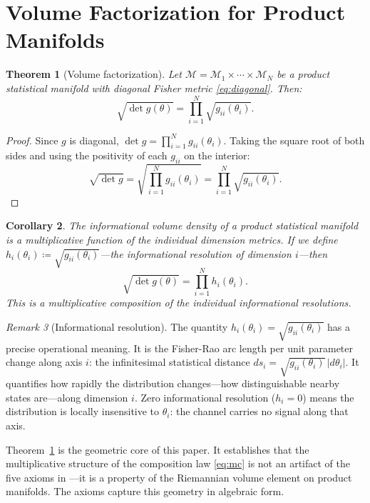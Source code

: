 \documentclass[12pt, a4paper]{article}
\newtheorem{theorem}{Theorem}[section]
\newtheorem{corollary}[theorem]{Corollary}
\theoremstyle{definition}
\theoremstyle{remark}
\newtheorem{remark}[theorem]{Remark}
\begin{document}
\section{Volume Factorization for Product Manifolds}\label{sec:factorization}

\begin{theorem}[Volume factorization]\label{thm:factor}
Let $\mathcal{M} = \mathcal{M}_1 \times \cdots \times \mathcal{M}_N$ be a product statistical manifold with diagonal Fisher metric \eqref{eq:diagonal}. Then:
\begin{equation}\label{eq:volfactor}
\sqrt{\det g(\theta)} = \prod_{i=1}^{N} \sqrt{g_{ii}(\theta_i)}.
\end{equation}
\end{theorem}

\begin{proof}
Since $g$ is diagonal, $\det g = \prod_{i=1}^{N} g_{ii}(\theta_i)$. Taking the square root of both sides and using the positivity of each $g_{ii}$ on the interior:
\[
\sqrt{\det g} = \sqrt{\prod_{i=1}^{N} g_{ii}(\theta_i)} = \prod_{i=1}^{N} \sqrt{g_{ii}(\theta_i)}.
\]
\end{proof}

\begin{corollary}\label{cor:mult}
The informational volume density of a product statistical manifold is a multiplicative function of the individual dimension metrics. If we define $h_i(\theta_i) \coloneqq \sqrt{g_{ii}(\theta_i)}$---the \textit{informational resolution} of dimension $i$---then
\[
\sqrt{\det g(\theta)} = \prod_{i=1}^{N} h_i(\theta_i).
\]
This is a multiplicative composition of the individual informational resolutions.
\end{corollary}

\begin{remark}[Informational resolution]
The quantity $h_i(\theta_i) = \sqrt{g_{ii}(\theta_i)}$ has a precise operational meaning. It is the Fisher-Rao arc length per unit parameter change along axis $i$: the infinitesimal statistical distance $ds_i = \sqrt{g_{ii}(\theta_i)} \, |d\theta_i|$. It quantifies how rapidly the distribution changes---how distinguishable nearby states are---along dimension $i$. Zero informational resolution ($h_i = 0$) means the distribution is locally insensitive to $\theta_i$: the channel carries no signal along that axis.
\end{remark}

Theorem~\ref{thm:factor} is the geometric core of this paper. It establishes that the multiplicative structure of the composition law \eqref{eq:mc} is not an artifact of the five axioms in \cite{kirsch2026mc}---it is a property of the Riemannian volume element on product manifolds. The axioms capture this geometry in algebraic form.
\end{document}
